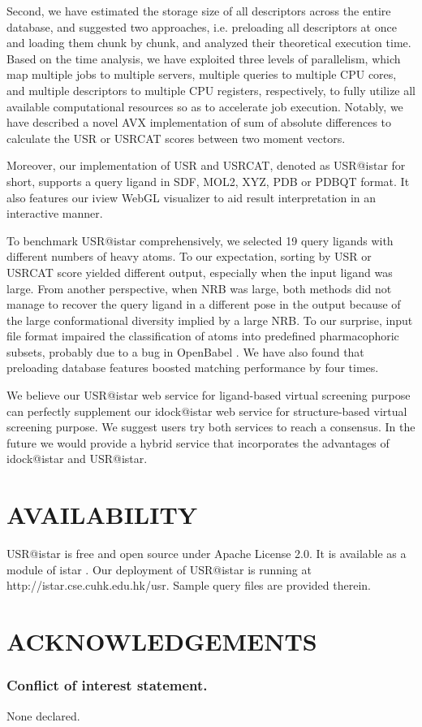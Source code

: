 \documentclass[a4,center,fleqn]{NAR}
\begin{document}
Second, we have estimated the storage size of all descriptors across the entire database, and suggested two approaches, i.e. preloading all descriptors at once and loading them chunk by chunk, and analyzed their theoretical execution time. Based on the time analysis, we have exploited three levels of parallelism, which map multiple jobs to multiple servers, multiple queries to multiple CPU cores, and multiple descriptors to multiple CPU registers, respectively, to fully utilize all available computational resources so as to accelerate job execution. Notably, we have described a novel AVX implementation of sum of absolute differences to calculate the USR or USRCAT scores between two moment vectors.

Moreover, our implementation of USR and USRCAT, denoted as USR@istar for short, supports a query ligand in SDF, MOL2, XYZ, PDB or PDBQT format. It also features our iview \cite{1366} WebGL visualizer to aid result interpretation in an interactive manner.

To benchmark USR@istar comprehensively, we selected 19 query ligands with different numbers of heavy atoms. To our expectation, sorting by USR or USRCAT score yielded different output, especially when the input ligand was large. From another perspective, when NRB was large, both methods did not manage to recover the query ligand in a different pose in the output because of the large conformational diversity implied by a large NRB. To our surprise, input file format impaired the classification of atoms into predefined pharmacophoric subsets, probably due to a bug in OpenBabel \cite{968}. We have also found that preloading database features boosted matching performance by four times.

We believe our USR@istar web service for ligand-based virtual screening purpose can perfectly supplement our idock@istar web service for structure-based virtual screening purpose. We suggest users try both services to reach a consensus. In the future we would provide a hybrid service that incorporates the advantages of idock@istar and USR@istar.

\section{AVAILABILITY}

USR@istar is free and open source under Apache License 2.0. It is available as a module of istar \cite{1362}. Our deployment of USR@istar is running at http://istar.cse.cuhk.edu.hk/usr. Sample query files are provided therein.

\section{ACKNOWLEDGEMENTS}


\subsubsection{Conflict of interest statement.} None declared.
\newpage

\end{document}
